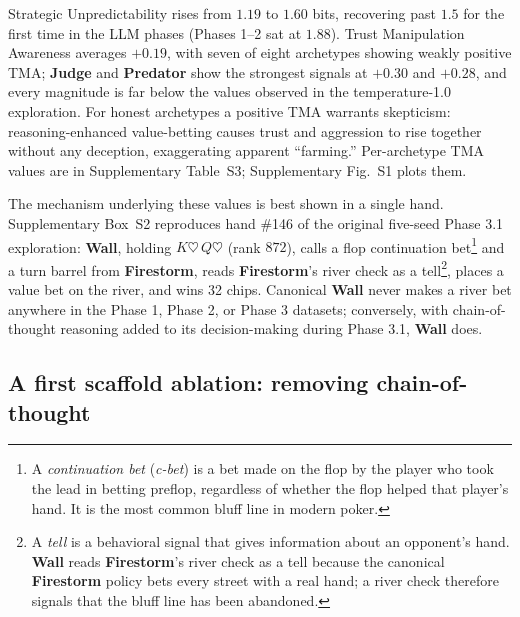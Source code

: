 \documentclass[journal]{IEEEtran}
\newcommand{\arch}[1]{\textbf{#1}}
\begin{document}
Strategic Unpredictability rises from $1.19$ to $1.60$ bits, recovering past $1.5$ for the first time in the LLM phases (Phases 1--2 sat at $1.88$). Trust Manipulation Awareness averages $+0.19$, with seven of eight archetypes showing weakly positive TMA; \arch{Judge} and \arch{Predator} show the strongest signals at $+0.30$ and $+0.28$, and every magnitude is far below the values observed in the temperature-1.0 exploration. For honest archetypes a positive TMA warrants skepticism: reasoning-enhanced value-betting causes trust and aggression to rise together without any deception, exaggerating apparent ``farming.'' Per-archetype TMA values are in Supplementary Table~S3; Supplementary Fig.~S1 plots them.


The mechanism underlying these values is best shown in a single
hand. Supplementary Box~S2 reproduces hand \#146 of the original five-seed Phase 3.1 exploration: \arch{Wall}, holding
$K\heartsuit\,Q\heartsuit$ (rank $872$), calls a flop continuation
bet\footnote{A \textit{continuation bet}
(\textit{c-bet}) is a bet made on the flop by the player who
took the lead in betting preflop, regardless of whether the
flop helped that player's hand. It is the most common bluff line
in modern poker.} and a turn barrel from \arch{Firestorm}, reads
\arch{Firestorm}'s river check as a tell\footnote{A
\textit{tell} is a behavioral signal that gives information
about an opponent's hand. \arch{Wall} reads \arch{Firestorm}'s
river check as a tell because the canonical \arch{Firestorm}
policy bets every street with a real hand; a river check
therefore signals that the bluff line has been abandoned.}, places
a value bet on the river, and wins 32 chips. Canonical \arch{Wall}
never makes a river bet anywhere in the Phase 1, Phase 2, or Phase 3
datasets; conversely, with chain-of-thought reasoning added to its
decision-making during Phase 3.1, \arch{Wall} does.


\subsection{A first scaffold ablation: removing chain-of-thought}
\end{document}
